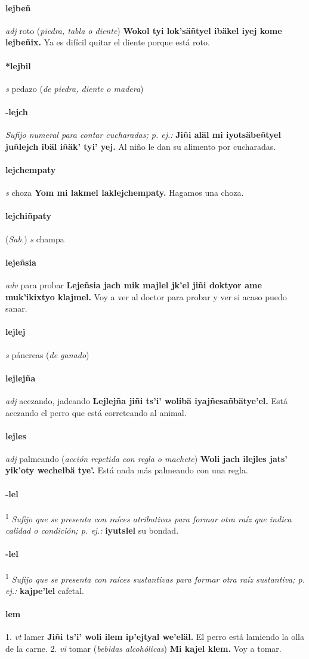 \documentclass{scrbook}
\newcommand{\entry}[1]{\paragraph{#1}}
\newcommand{\onedefinition}[1]{#1.}
\newcommand{\defsuperscript}[1]{\textsuperscript{1}}
\newcommand{\nontranslationdef}[1]{\textit{#1}}
\newcommand{\partofspeech}[1]{\textit{#1}}
\newcommand{\spanishtranslation}[1]{#1}
\newcommand{\clarification}[1]{(\textit{#1})}
\newcommand{\cholexample}[1]{\textbf{#1}}
\newcommand{\exampletranslation}[1]{#1}
\newcommand{\relevantdialect}[1]{(\textit{#1})}
\begin{document}
\begin{multicols}{2}
\entry{lejbeñ}
\partofspeech{adj}
\spanishtranslation{roto}
\clarification{piedra, tabla o diente}
\cholexample{Wokol tyi lok'säñtyel ibäkel iyej kome lejbeñix.}
\exampletranslation{Ya es difícil quitar el diente porque está roto.}

\entry{*lejbil}
\partofspeech{s}
\spanishtranslation{pedazo}
\clarification{de piedra, diente o madera}

\entry{-lejch}
\nontranslationdef{Sufijo numeral para contar cucharadas; p. ej.:}
\cholexample{Jiñi aläl mi iyotsäbeñtyel juñlejch ibäl iñäk' tyi' yej.}
\exampletranslation{Al niño le dan su alimento por cucharadas.}

\entry{lejchempaty}
\partofspeech{s}
\spanishtranslation{choza}
\cholexample{Yom mi lakmel laklejchempaty.}
\exampletranslation{Hagamos una choza.}

\entry{lejchiñpaty}
\relevantdialect{Sab.}
\partofspeech{s}
\spanishtranslation{champa}

\entry{lejeñsia}
\partofspeech{adv}
\spanishtranslation{para probar}
\cholexample{Lejeñsia jach mik majlel jk'el jiñi doktyor ame muk'ikixtyo klajmel.}
\exampletranslation{Voy a ver al doctor para probar y ver si acaso puedo sanar.}

\entry{lejlej}
\partofspeech{s}
\spanishtranslation{páncreas}
\clarification{de ganado}

\entry{lejlejña}
\partofspeech{adj}
\spanishtranslation{acezando, jadeando}
\cholexample{Lejlejña jiñi ts'i' wolibä iyajñesañbätye'el.}
\exampletranslation{Está acezando el perro que está correteando al animal.}

\entry{lejles}
\partofspeech{adj}
\spanishtranslation{palmeando}
\clarification{acción repetida con regla o machete}
\cholexample{Woli jach ilejles jats' yik'oty wechelbä tye'.}
\exampletranslation{Está nada más palmeando con una regla.}

\entry{-lel}
\defsuperscript{1}
\nontranslationdef{Sufijo que se presenta con raíces atributivas para formar otra raíz que indica calidad o condición; p. ej.:}
\cholexample{iyutslel}
\exampletranslation{su bondad.}

\entry{-lel}
\defsuperscript{2}
\nontranslationdef{Sufijo que se presenta con raíces sustantivas para formar otra raíz sustantiva; p. ej.:}
\cholexample{kajpe'lel}
\exampletranslation{cafetal.}

\entry{lem}
\onedefinition{1}
\partofspeech{vt}
\spanishtranslation{lamer}
\cholexample{Jiñi ts'i' woli ilem ip'ejtyal we'eläl.}
\exampletranslation{El perro está lamiendo la olla de la carne.}
\onedefinition{2}
\partofspeech{vi}
\spanishtranslation{tomar}
\clarification{bebidas alcohólicas}
\cholexample{Mi kajel klem.}
\exampletranslation{Voy a tomar.}


\end{multicols}
\end{document}
